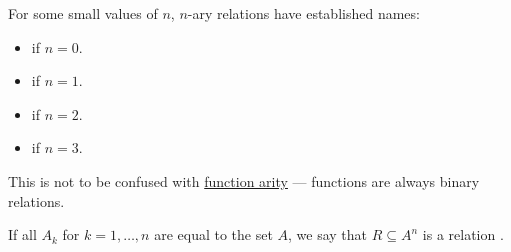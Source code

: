 \begin{definition}
\begin{thmenum}[series=def:relation]
     For some small values of \( n \), \( n \)-ary relations have established names:
    \begin{itemize}
      \item {} if \( n = 0 \).
      \item {} if \( n = 1 \).
      \item {} if \( n = 2 \).
      \item {} if \( n = 3 \).
    \end{itemize}

    This is not to be confused with \hyperref[def:multi_valued_function/arity]{function arity} --- functions are always binary relations.

     If all \( A_k \) for \( k = 1, \ldots, n \) are equal to the set \( A \), we say that \( R \subseteq A^n \) is a relation .
  \end{thmenum}
\end{definition}


